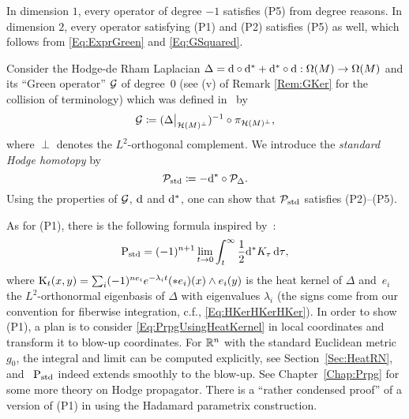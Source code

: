 \documentclass[\MainFolder/Text.tex]{subfiles}
\begin{document}
\begin{Remark}
In dimension $1$, every operator of degree $-1$ satisfies (P5) from degree reasons. In dimension $2$, every operator satisfying (P1) and (P2) satisfies (P5) as well, which follows from \eqref{Eq:ExprGreen} and \eqref{Eq:GSquared}.
\end{Remark}


\begin{Remark}
Consider the Hodge-de Rham Laplacian $\Delta = \mathrm{d} \circ \mathrm{d}^* + \mathrm{d}^* \circ \mathrm{d} : \Omega(M) \rightarrow \Omega(M)$ and its ``Green operator'' $\operatorname{\mathcal{G}}$ of degree~$0$ (see (v) of Remark \ref{Rem:GKer} for the collision of terminology) which was defined in~\cite[Definition~6.9]{Warner1983} by
\[\GOp \coloneqq (\Restr{\Delta}{\Harm(M)^{\perp}})^{-1} \circ \pi_{\Harm(M)^\perp}, \]
where $\perp$ denotes the $L^2$-orthogonal complement. We introduce the \emph{standard Hodge homotopy} by
\begin{equation}\label{Eq:GStdStd}
\mathcal{P}_{\mathrm{std}} \coloneqq -\mathrm{d}^*\circ \mathcal{P}_{\Delta}.
\end{equation}
Using the properties of $\operatorname{\mathcal{G}}$, $\mathrm{d}$ and $\mathrm{d}^*$, one can show that $\mathcal{P}_{\mathrm{std}}$ satisfies (P2)--(P5).

As for (P1), there is the following formula inspired by~\cite{Harris2004}:
\begin{equation}\label{Eq:PrpgUsingHeatKernel}
\mathrm{P}_{\mathrm{std}} = (-1)^{n+1}\lim_{t\to 0} \int_t^\infty \frac{1}{2}\mathrm{d}^* K_\tau \operatorname{d\tau},
\end{equation}
where $\mathrm{K}_t(x,y) = \sum_i (-1)^{n e_i} e^{-\lambda_i t} (* e_i)(x) \wedge e_i(y)$ is the heat kernel of $\Delta$ and~$e_i$ the $L^2$-orthonormal eigenbasis of $\Delta$ with eigenvalues $\lambda_i$ (the signs come from our convention for fiberwise integration, c.f., \eqref{Eq:HKerHKerHKer}).
In order to show (P1), a plan is to consider \eqref{Eq:PrpgUsingHeatKernel} in local coordinates and transform it to blow-up coordinates.
For $\mathbb{R}^n$ with the standard Euclidean metric $g_0$, the integral and limit can be computed explicitly, see Section~\ref{Sec:HeatRN}, and~ $\mathrm{P}_{\mathrm{std}}$ indeed extends smoothly to the blow-up.
See Chapter~\ref{Chap:Prpg} for some more theory on Hodge propagator.
There is a ``rather condensed proof'' of a version of (P1) in \cite[Section~4.3]{Axelrod1993} using the Hadamard parametrix construction.
\end{Remark}
\end{document}
